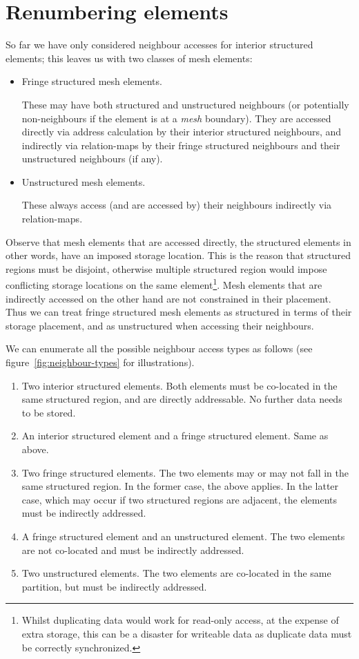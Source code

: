 \section{Renumbering elements}
\label{sec:renumbering-elements}
So far we have only considered neighbour accesses for interior structured elements; this leaves us with two classes of mesh elements:
\begin{itemize}
\item Fringe structured mesh elements.

These may have both structured and unstructured neighbours (or potentially non-neighbours if the element is at a \emph{mesh} boundary). They are accessed directly via address calculation by their interior structured neighbours, and indirectly via relation-maps by their fringe structured neighbours and their unstructured neighbours (if any).

\item Unstructured mesh elements.

These always access (and are accessed by) their neighbours indirectly via relation-maps.
\end{itemize}

Observe that mesh elements that are accessed directly, the structured elements in other words, have an imposed storage location. This is the reason that structured regions must be disjoint, otherwise multiple structured region would impose conflicting storage locations on the same element\footnote{Whilst duplicating data would work for read-only access, at the expense of extra storage, this can be a disaster for writeable data as duplicate data must be correctly synchronized.}. Mesh elements that are indirectly accessed on the other hand are not constrained in their placement. Thus we can treat fringe structured mesh elements as structured in terms of their storage placement, and as unstructured when accessing their neighbours.

We can enumerate all the possible neighbour access types as follows (see figure~\ref{fig:neighbour-types} for illustrations).
\begin{enumerate}[label=\alph*)]
\item Two interior structured elements.
Both elements must be co-located in the same structured region, and are directly addressable. No further data needs to be stored.
\item An interior structured element and a fringe structured element.
Same as above.
\item Two fringe structured elements.
The two elements may or may not fall in the same structured region. In the former case, the above applies. In the latter case, which may occur if two structured regions are adjacent, the elements must be indirectly addressed.
\item A fringe structured element and an unstructured element.
The two elements are not co-located and must be indirectly addressed.
\item Two unstructured elements.
The two elements are co-located in the same partition, but must be indirectly addressed.
\end{enumerate}

